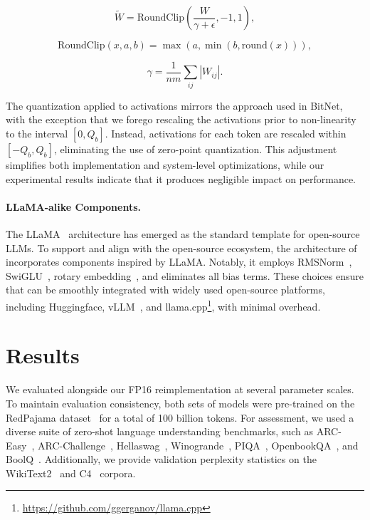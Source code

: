 \begin{equation}
    \widetilde{W} = \mathrm{RoundClip}(\frac{W}{\gamma + \epsilon}, -1, 1),
\end{equation}

\begin{equation}
    \mathrm{RoundClip}(x, a, b) = \max(a, \min(b, \mathrm{round}(x))),
\end{equation}

\begin{equation}
    \gamma = \frac{1}{nm}\sum_{ij} |W_{ij}|.
\end{equation}

The quantization applied to activations mirrors the approach used in BitNet, with the exception that we forego rescaling the activations prior to non-linearity to the interval $[0, Q_b]$. Instead, activations for each token are rescaled within $[-Q_b, Q_b]$, eliminating the use of zero-point quantization. This adjustment simplifies both implementation and system-level optimizations, while our experimental results indicate that it produces negligible impact on performance.

\paragraph{LLaMA-alike Components.}

The LLaMA~\cite{llama, llama2} architecture has emerged as the standard template for open-source LLMs. To support and align with the open-source ecosystem, the architecture of  incorporates components inspired by LLaMA. Notably, it employs RMSNorm~\cite{rmsnorm}, SwiGLU~\cite{swiglu}, rotary embedding~\cite{rope}, and eliminates all bias terms. These choices ensure that  can be smoothly integrated with widely used open-source platforms, including Huggingface, vLLM~\cite{vllm}, and llama.cpp\footnote{\url{https://github.com/ggerganov/llama.cpp}}, with minimal overhead.

\section{Results}

We evaluated  alongside our FP16  reimplementation at several parameter scales. To maintain evaluation consistency, both sets of models were pre-trained on the RedPajama dataset~\cite{redpajama} for a total of 100 billion tokens. For assessment, we used a diverse suite of zero-shot language understanding benchmarks, such as ARC-Easy~\cite{arc}, ARC-Challenge~\cite{arc}, Hellaswag~\cite{hellaswag}, Winogrande~\cite{winoGrande}, PIQA~\cite{piqa}, OpenbookQA~\cite{openbookqa}, and BoolQ~\cite{boolq}. Additionally, we provide validation perplexity statistics on the WikiText2~\cite{wikitext2} and C4~\cite{c4} corpora.

